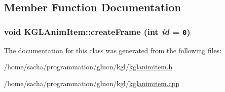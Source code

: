 \subsection{Member Function Documentation}
\hypertarget{class_k_g_l_anim_item_6b61e41500543929dda03b741240cfb5}{
\subsubsection[{createFrame}]{\setlength{\rightskip}{0pt plus 5cm}void KGLAnimItem::createFrame (int {\em id} = {\tt 0})}}
\label{class_k_g_l_anim_item_6b61e41500543929dda03b741240cfb5}




The documentation for this class was generated from the following files:\begin{CompactItemize}
\item 
/home/sacha/programmation/gluon/kgl/\hyperlink{kglanimitem_8h}{kglanimitem.h}\item 
/home/sacha/programmation/gluon/kgl/\hyperlink{kglanimitem_8cpp}{kglanimitem.cpp}\end{CompactItemize}
